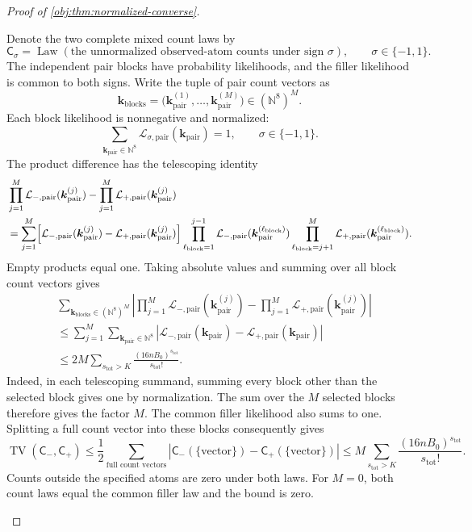 \begin{proof}[Proof of \cref{obj:thm:normalized-converse}]
\begin{enumerate}
Denote the two complete mixed count laws by
\[
\mathsf C_\sigma
=\operatorname{Law}(\text{the unnormalized observed-atom counts
under sign }\sigma),
\qquad \sigma\in\{-1,1\}.
\]
The independent pair blocks have probability likelihoods, and the filler likelihood is common to both signs. Write the tuple of pair count vectors as
\[
\boldsymbol{k}_{\mathrm{blocks}}
=\bigl(\boldsymbol{k}_{\mathrm{pair}}^{(1)},\ldots,
       \boldsymbol{k}_{\mathrm{pair}}^{(M)}\bigr)
\in(\mathbb N^8)^M.
\]
Each block likelihood is nonnegative and normalized:
\[
\sum_{\boldsymbol{k}_{\mathrm{pair}}\in\mathbb N^8}
\mathcal L_{\sigma,\mathrm{pair}}(\boldsymbol{k}_{\mathrm{pair}})=1,
\qquad \sigma\in\{-1,1\}.
\]
The product difference has the telescoping identity
\[
\begin{aligned}
&\prod_{j=1}^{M}
\mathcal L_{-,\mathrm{pair}}(\boldsymbol{k}_{\mathrm{pair}}^{(j)})
-\prod_{j=1}^{M}
\mathcal L_{+,\mathrm{pair}}(\boldsymbol{k}_{\mathrm{pair}}^{(j)})\\
&=\sum_{j=1}^{M}
\Bigl[
\mathcal L_{-,\mathrm{pair}}(\boldsymbol{k}_{\mathrm{pair}}^{(j)})
-\mathcal L_{+,\mathrm{pair}}(\boldsymbol{k}_{\mathrm{pair}}^{(j)})
\Bigr]
\prod_{\ell_{\mathrm{block}}=1}^{j-1}
\mathcal L_{-,\mathrm{pair}}
 (\boldsymbol{k}_{\mathrm{pair}}^{(\ell_{\mathrm{block}})})
\prod_{\ell_{\mathrm{block}}=j+1}^{M}
\mathcal L_{+,\mathrm{pair}}
 (\boldsymbol{k}_{\mathrm{pair}}^{(\ell_{\mathrm{block}})}).
\end{aligned}
\]
Empty products equal one. Taking absolute values and summing over all block count vectors gives
\[
\begin{aligned}
&\sum_{\boldsymbol{k}_{\mathrm{blocks}}\in(\mathbb N^8)^M}
\left|
\prod_{j=1}^{M}
\mathcal L_{-,\mathrm{pair}}(\boldsymbol{k}_{\mathrm{pair}}^{(j)})
-\prod_{j=1}^{M}
\mathcal L_{+,\mathrm{pair}}(\boldsymbol{k}_{\mathrm{pair}}^{(j)})
\right|\\
&\le\sum_{j=1}^{M}
\sum_{\boldsymbol{k}_{\mathrm{pair}}\in\mathbb N^8}
\left|
\mathcal L_{-,\mathrm{pair}}(\boldsymbol{k}_{\mathrm{pair}})
-\mathcal L_{+,\mathrm{pair}}(\boldsymbol{k}_{\mathrm{pair}})
\right|\\
&\le 2M\sum_{s_{\mathrm{tot}}>K}
\frac{(16nB_0)^{s_{\mathrm{tot}}}}{s_{\mathrm{tot}}!}.
\end{aligned}
\]
Indeed, in each telescoping summand, summing every block other than the selected block gives one by normalization. The sum over the \(M\) selected blocks therefore gives the factor \(M\). The common filler likelihood also sums to one. Splitting a full count vector into these blocks consequently gives
\[
\operatorname{TV}(\mathsf C_-,\mathsf C_+)
\le
\frac12\sum_{\text{full count vectors}}
|\mathsf C_-(\{\text{vector}\})-\mathsf C_+(\{\text{vector}\})|
\le
M\sum_{s_{\mathrm{tot}}>K}
\frac{(16nB_0)^{s_{\mathrm{tot}}}}{s_{\mathrm{tot}}!}.
\]
Counts outside the specified atoms are zero under both laws. For \(M=0\), both count laws equal the common filler law and the bound is zero.


\end{enumerate}
\end{proof}
